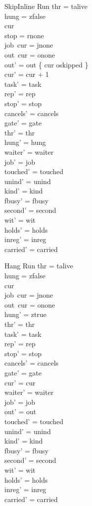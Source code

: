 \documentclass[a4paper,10pt,fleqn]{article}
\begin{document}
\begin{schema}{SkipInline}
\Delta Run
\where
thr = talive \\
hung = zfalse \\
cur   \\
stop = rnone \\
job~cur = jnone \\
out~cur = onone \\
out' = out \oplus \{ cur \mapsto oskipped \} \\
cur' = cur + 1 \\
task' = task \\
rep' = rep \\
stop' = stop \\
cancels' = cancels \\
gate' = gate \\
thr' = thr \\
hung' = hung \\
waiter' = waiter \\
job' = job \\
touched' = touched \\
unind' = unind \\
kind' = kind \\
fbusy' = fbusy \\
second' = second \\
wit' = wit \\
holds' = holds \\
inreg' = inreg \\
carried' = carried
\end{schema}

\begin{schema}{Hang}
\Delta Run
\where
thr = talive \\
hung = zfalse \\
cur   \\
job~cur = jnone \\
out~cur = onone \\
hung' = ztrue \\
thr' = thr \\
task' = task \\
rep' = rep \\
stop' = stop \\
cancels' = cancels \\
gate' = gate \\
cur' = cur \\
waiter' = waiter \\
job' = job \\
out' = out \\
touched' = touched \\
unind' = unind \\
kind' = kind \\
fbusy' = fbusy \\
second' = second \\
wit' = wit \\
holds' = holds \\
inreg' = inreg \\
carried' = carried
\end{schema}
\end{document}
